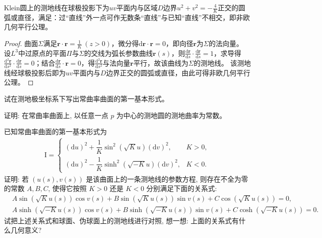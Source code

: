 \documentclass[../../main.tex]{subfiles}%
\begin{document}
\begin{theorem}
Klein圆上的测地线在球极投影下为$uv$平面内与区域$D$边界$u^2+v^2=-\frac{4}{K}$正交的圆弧或直径，满足：过“直线”外一点可作无数条“直线”与已知“直线”不相交，即非欧几何平行公理。
\end{theorem}

\begin{proof}
曲面$\Sigma$满足$\bm{r}\cdot\bm{r}=\frac{1}{K}\ (z>0)$，微分得$\mathrm{d}\bm{r}\cdot\bm{r}=0$，即向径$\bm{r}$为$\Sigma$的法向量。
设$L^3$中过原点的平面$\Pi$与$\Sigma$的交线为弧长参数曲线$\bm{r}(s)$，则$\frac{\mathrm{d}\bm{r}}{\mathrm{d}s}\cdot\frac{\mathrm{d}\bm{r}}{\mathrm{d}s}=1$，求导得$\frac{\mathrm{d}^2\bm{r}}{\mathrm{d}s^2}\cdot\frac{\mathrm{d}\bm{r}}{\mathrm{d}s}=0$；结合$\frac{\mathrm{d}\bm{r}}{\mathrm{d}s}\cdot\bm{r}=0$，得$\frac{\mathrm{d}^2\bm{r}}{\mathrm{d}s^2}$与法向量$\bm{r}$平行，故该曲线为$\Sigma$的测地线。
该测地线经球极投影后即为$uv$平面内与$D$边界正交的圆弧或直径，由此可得非欧几何平行公理。
\end{proof}

\begin{example}
试在测地极坐标系下写出常曲率曲面的第一基本形式。
\end{example}

\begin{example}
证明: 在常曲率曲面上, 以任意一点 $p$ 为中心的测地圆的测地曲率为常数。
\end{example}

\begin{example}
已知常曲率曲面的第一基本形式为
\begin{align*}
\mathrm{I}=
\begin{cases}
(\mathrm{d}u)^2+\dfrac{1}{K}\sin^2(\sqrt{K}u)(\mathrm{d}v)^2, & K>0,\\
(\mathrm{d}u)^2-\dfrac{1}{K}\sinh^2(\sqrt{-K}u)(\mathrm{d}v)^2, & K<0.
\end{cases}
\end{align*}
证明: 若 $(u(s),v(s))$ 是该曲面上的一条测地线的参数方程, 则存在不全为零的常数 $A,B,C$, 使得它按照 $K>0$ 还是 $K<0$ 分别满足下面的关系式:
\begin{align*}
&A\sin(\sqrt{K}u(s))\cos v(s)+B\sin(\sqrt{K}u(s))\sin v(s)+C\cos(\sqrt{K}u(s))=0,\\
&A\sinh(\sqrt{-K}u(s))\cos v(s)+B\sinh(\sqrt{-K}u(s))\sin v(s)+C\cosh(\sqrt{-K}u(s))=0.
\end{align*}
试把上述关系式和球面、伪球面上的测地线进行对照, 想一想: 上面的关系式有什么几何意义?
\end{example}
\end{document}
